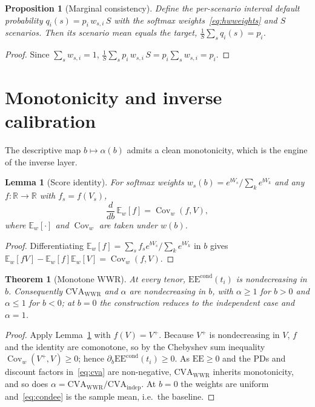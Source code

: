 \documentclass[12pt]{article}
\newtheorem{theorem}{Theorem}
\newtheorem{proposition}{Proposition}
\newtheorem{lemma}{Lemma}
\newcommand{\E}{\mathbb{E}}
\newcommand{\Cov}{\operatorname{Cov}}
\newcommand{\EE}{\mathrm{EE}}
\newcommand{\CVA}{\mathrm{CVA}}
\begin{document}
\begin{proposition}[Marginal consistency]\label{prop:marg}
Define the per-scenario interval default probability
$q_i(s)=p_i\,w_{s,i}\,S$ with the softmax weights~\eqref{eq:hwweights} and $S$
scenarios. Then its scenario mean equals the target,
$\tfrac{1}{S}\sum_s q_i(s)=p_i$.
\end{proposition}
\begin{proof}
Since $\sum_s w_{s,i}=1$,
$\tfrac1S\sum_s p_i\,w_{s,i}\,S=p_i\sum_s w_{s,i}=p_i.$
\end{proof}

\section{Monotonicity and inverse calibration}\label{sec:inverse}
The descriptive map $b\mapsto\alpha(b)$ admits a clean monotonicity, which is
the engine of the inverse layer.

\begin{lemma}[Score identity]\label{lem:cov}
For softmax weights $w_s(b)=e^{bV_s}/\sum_k e^{bV_k}$ and any
$f:\mathbb{R}\to\mathbb{R}$ with $f_s=f(V_s)$,
\begin{equation}
\frac{d}{db}\,\E_{w}[f]=\Cov_{w}(f,V),
\end{equation}
where $\E_w[\cdot]$ and $\Cov_w$ are taken under $w(b)$.
\end{lemma}
\begin{proof}
Differentiating $\E_w[f]=\sum_s f_s e^{bV_s}/\sum_k e^{bV_k}$ in $b$ gives
$\E_w[fV]-\E_w[f]\E_w[V]=\Cov_w(f,V)$.
\end{proof}

\begin{theorem}[Monotone WWR]\label{thm:mono}
At every tenor, $\EE^{\mathrm{cond}}(t_i)$ is nondecreasing in $b$. Consequently
$\CVA_{\text{WWR}}$ and $\alpha$ are nondecreasing in $b$, with $\alpha\ge1$ for
$b>0$ and $\alpha\le1$ for $b<0$; at $b=0$ the construction reduces to the
independent case and $\alpha=1$.
\end{theorem}
\begin{proof}
Apply Lemma~\ref{lem:cov} with $f(V)=V^{+}$. Because $V^{+}$ is nondecreasing in
$V$, $f$ and the identity are comonotone, so by the Chebyshev sum inequality
$\Cov_w(V^{+},V)\ge0$; hence $\partial_b\EE^{\mathrm{cond}}(t_i)\ge0$. As
$\EE\ge0$ and the PDs and discount factors in~\eqref{eq:cva} are non-negative,
$\CVA_{\text{WWR}}$ inherits monotonicity, and so does
$\alpha=\CVA_{\text{WWR}}/\CVA_{\text{indep}}$. At $b=0$ the weights are uniform
and~\eqref{eq:condee} is the sample mean, i.e.\ the baseline.
\end{proof}
\end{document}
